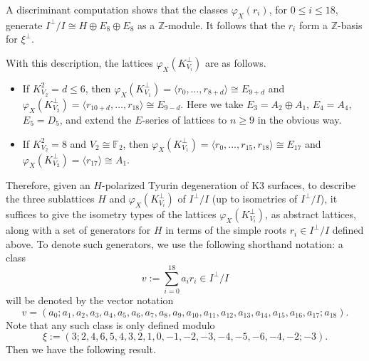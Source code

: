 \documentclass[a4paper]{amsart}
\theoremstyle{definition}
\theoremstyle{plain}
\theoremstyle{remark}
\newcommand{\bF}{\mathbb{F}}
\newcommand{\bZ}{\mathbb{Z}}
\numberwithin{figure}{section}
\numberwithin{table}{section}
\begin{document}
A discriminant computation shows that the classes $\varphi_X(r_i)$, for $0 \leq i \leq 18$, generate $I^{\perp}/I \cong H \oplus E_8 \oplus E_8$ as a $\bZ$-module. It follows that the $r_i$ form a $\bZ$-basis for $\xi^{\perp}$.

With this description, the lattices $\varphi_X(K_{V_i}^{\perp})$ are as follows.
\begin{itemize}
\item If $K_{V_2}^2 = d \leq 6$, then $\varphi_X(K_{V_1}^{\perp}) = \langle r_0,\ldots,r_{8+d}\rangle \cong E_{9+d}$ and  $\varphi_X(K_{V_2}^{\perp}) = \langle r_{10+d},\ldots,r_{18} \rangle \cong E_{9-d}$. Here we take $E_3 = A_2 \oplus A_1$, $E_4 = A_4$, $E_5 = D_5$, and extend the $E$-series of lattices to $n \geq 9$ in the obvious way.
\item If $K_{V_2}^2 = 8$ and $V_2 \cong \bF_2$, then $\varphi_X(K_{V_1}^{\perp}) = \langle r_0,\ldots,r_{15},r_{18}\rangle \cong E_{17}$ and  $\varphi_X(K_{V_2}^{\perp}) = \langle r_{17} \rangle \cong A_1$.
\end{itemize}

Therefore, given an $H$-polarized Tyurin degeneration of K3 surfaces, to describe the three sublattices $H$ and $\varphi_X(K_{V_i}^{\perp})$ of $I^{\perp}/I$ (up to isometries of $I^{\perp}/I$), it suffices to give the isometry types of the lattices $\varphi_X(K_{V_i}^{\perp})$, as abstract lattices, along with a set of generators for $H$ in terms of the simple roots $r_i \in I^{\perp}/I$ defined above. To denote such generators, we use the following shorthand notation: a class
\[v:= \sum_{i=0}^{18}a_ir_i \in I^{\perp}/I\]
will be denoted by the vector notation
\begin{equation} \label{eq:vectornotation} v = (a_0; a_1,a_2,a_3,a_4,a_5, a_6,a_7,a_8,a_9,a_{10},a_{11},a_{12},a_{13},a_{14},a_{15},a_{16},a_{17};a_{18}).\end{equation}
Note that any such class is only defined modulo 
\[\xi := (3;2,4,6,5,4,3,2,1,0,-1,-2,-3,-4,-5,-6,-4,-2;-3).\]
Then we have the following result.
\end{document}
